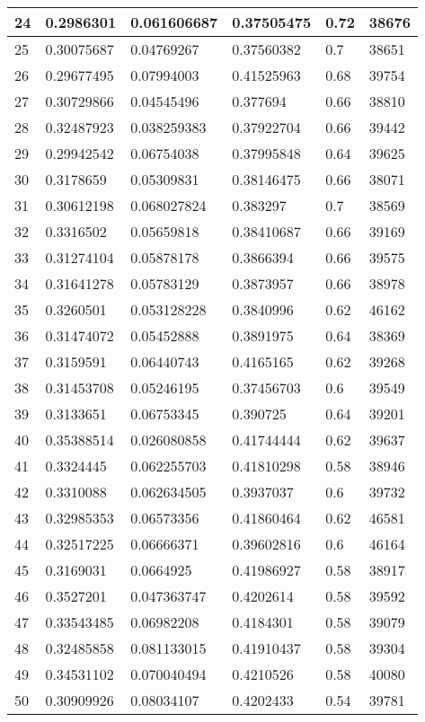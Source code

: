 \begin{longtable}{|l|l|l|l|l|l|}
24 & 0.2986301 & 0.061606687 & 0.37505475 & 0.72 & 38676 \\ \hline 
25 & 0.30075687 & 0.04769267 & 0.37560382 & 0.7 & 38651 \\ \hline 
26 & 0.29677495 & 0.07994003 & 0.41525963 & 0.68 & 39754 \\ \hline 
27 & 0.30729866 & 0.04545496 & 0.377694 & 0.66 & 38810 \\ \hline 
28 & 0.32487923 & 0.038259383 & 0.37922704 & 0.66 & 39442 \\ \hline 
29 & 0.29942542 & 0.06754038 & 0.37995848 & 0.64 & 39625 \\ \hline 
30 & 0.3178659 & 0.05309831 & 0.38146475 & 0.66 & 38071 \\ \hline 
31 & 0.30612198 & 0.068027824 & 0.383297 & 0.7 & 38569 \\ \hline 
32 & 0.3316502 & 0.05659818 & 0.38410687 & 0.66 & 39169 \\ \hline 
33 & 0.31274104 & 0.05878178 & 0.3866394 & 0.66 & 39575 \\ \hline 
34 & 0.31641278 & 0.05783129 & 0.3873957 & 0.66 & 38978 \\ \hline 
35 & 0.3260501 & 0.053128228 & 0.3840996 & 0.62 & 46162 \\ \hline 
36 & 0.31474072 & 0.05452888 & 0.3891975 & 0.64 & 38369 \\ \hline 
37 & 0.3159591 & 0.06440743 & 0.4165165 & 0.62 & 39268 \\ \hline 
38 & 0.31453708 & 0.05246195 & 0.37456703 & 0.6 & 39549 \\ \hline 
39 & 0.3133651 & 0.06753345 & 0.390725 & 0.64 & 39201 \\ \hline 
40 & 0.35388514 & 0.026080858 & 0.41744444 & 0.62 & 39637 \\ \hline 
41 & 0.3324445 & 0.062255703 & 0.41810298 & 0.58 & 38946 \\ \hline 
42 & 0.3310088 & 0.062634505 & 0.3937037 & 0.6 & 39732 \\ \hline 
43 & 0.32985353 & 0.06573356 & 0.41860464 & 0.62 & 46581 \\ \hline 
44 & 0.32517225 & 0.06666371 & 0.39602816 & 0.6 & 46164 \\ \hline 
45 & 0.3169031 & 0.0664925 & 0.41986927 & 0.58 & 38917 \\ \hline 
46 & 0.3527201 & 0.047363747 & 0.4202614 & 0.58 & 39592 \\ \hline 
47 & 0.33543485 & 0.06982208 & 0.4184301 & 0.58 & 39079 \\ \hline 
48 & 0.32485858 & 0.081133015 & 0.41910437 & 0.58 & 39304 \\ \hline 
49 & 0.34531102 & 0.070040494 & 0.4210526 & 0.58 & 40080 \\ \hline 
50 & 0.30909926 & 0.08034107 & 0.4202433 & 0.54 & 39781 \\ \hline 
\end{longtable}